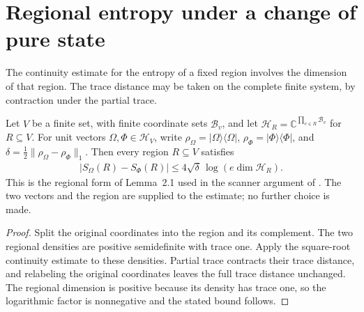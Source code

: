 \section{Regional entropy under a change of pure state}

The continuity estimate for the entropy of a fixed region involves the
dimension of that region. The trace distance may be taken on the complete
finite system, by contraction under the partial trace.

\begin{theorem}
  \label{thm:finite_product_entropy_continuity}
  \leanok
  Let $V$ be a finite set, with finite coordinate sets $\mathcal B_v$, and
  let $\mathcal H_R=\mathbb C^{\prod_{v\in R}\mathcal B_v}$ for $R\subseteq V$.
  For unit vectors $\Omega,\Phi\in\mathcal H_V$, write
  $\rho_\Omega=|\Omega\rangle\langle\Omega|$,
  $\rho_\Phi=|\Phi\rangle\langle\Phi|$, and
  $\delta=\tfrac12\|\rho_\Omega-\rho_\Phi\|_1$.
  Then every region $R\subseteq V$ satisfies
  \begin{align*}
    |S_\Omega(R)-S_\Phi(R)|
    \le 4\sqrt\delta\,\log(e\dim\mathcal H_R).
  \end{align*}
  This is the regional form of Lemma~2.1 used in the scanner argument
  of \cite[Section~9]{OpenAI2026AreaLaw}. The two vectors and the region
  are supplied to the estimate; no further choice is made.
\end{theorem}
\begin{proof}
  \leanok
  Split the original coordinates into the region and its complement.
  The two regional densities are positive semidefinite with trace one.
  Apply the square-root continuity estimate to these densities. Partial
  trace contracts their trace distance, and relabeling the original
  coordinates leaves the full trace distance unchanged. The regional
  dimension is positive because its density has trace one, so the
  logarithmic factor is nonnegative and the stated bound follows.
\end{proof}
